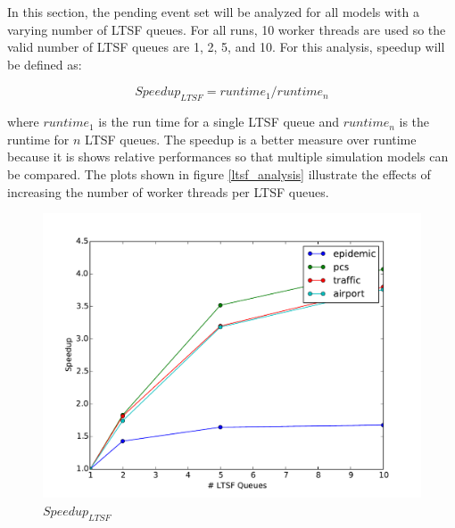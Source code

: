 \documentclass[11pt]{book}
\begin{document}
In this section, the pending event set will be analyzed for all models with a varying number of
LTSF queues. For all runs, 10 worker threads are used so the valid number of LTSF queues are
1, 2, 5, and 10. For this analysis, speedup will be defined as:

$$ Speedup_{LTSF} = runtime_{1}/runtime_{n} $$

\noindent
where $runtime_{1}$ is the run time for a single LTSF queue and $runtime_{n}$ is the runtime
for $n$ LTSF queues. The speedup is a better measure over runtime because it is shows relative
performances so that multiple simulation models can be compared. The plots shown in figure
\ref{ltsf_analysis} illustrate the effects of increasing the number of worker threads per LTSF
queues.

\begin{figure}
  \begin{minipage}{.5\textwidth}
    \begin{center}
      \includegraphics[width=\textwidth,keepaspectratio,quiet]{figs/pending_event_set/ltsf_speedup.pdf} \\
      $Speedup_{LTSF}$ \\
    \end{center}
  \end{minipage}%
  \hfill
  \begin{minipage}{.5\textwidth}
    \begin{center}

\end{center}
\end{minipage}
\end{figure}
\end{document}
